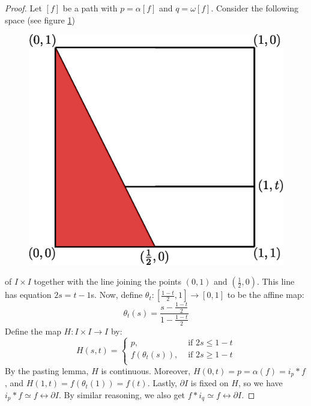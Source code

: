 \begin{proof}
    Let $[f]$ be a path with $p=\alpha[f]$ and $q=\omega[f]$. Consider the
    following space (see figure \ref{fig_4.1})
    \begin{figure}[h]
        \centering
        \includegraphics[scale=0.5]{Figures/chapter4/path_identity.eps}
        \caption{}
        \label{fig_4.1}
    \end{figure}
    of $I \times I$ together with the line joining the points  $(0,1)$ and
    $(\frac{1}{2},0)$. This line has equation $2s=t-1$s. Now, define
    $\theta_t:[\frac{1-t}{2},1] \xrightarrow{} [0,1]$ to be the affine map:
    \begin{equation*}
        \theta_t(s)=\frac{s-\frac{1-t}{2}}{1-\frac{1-t}{2}}
    \end{equation*}
    Define the map $H:I \times I \xrightarrow{} I$ by:
    \begin{equation*}
       H(s,t)=\begin{cases}
                p, & \text{ if } 2s \leq 1-t    \\
                f(\theta_t(s)), & \text{ if } 2s \geq 1-t   \\
            \end{cases}
    \end{equation*}
    By the pasting lemma, $H$ is continuous. Moreover,  $H(0,t)=p=\alpha(f)=i_p
    \ast f$, and $H(1,t)=f(\theta_t(1))=f(t)$. Lastly, $\partial{I}$ is fixed on
    $H$, so we have $i_p \ast f \simeq f \rel{\partial{I}}$. By similar
    reasoning, we also get $f \ast i_q \simeq f \rel{\partial{I}}$.


\end{proof}
